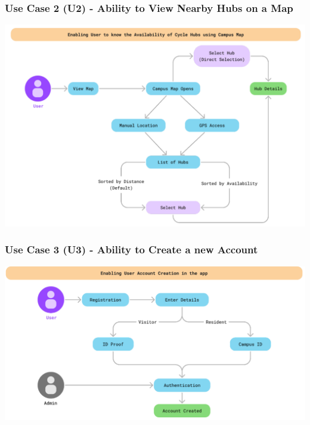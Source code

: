 \documentclass[11pt]{article}
\begin{document}
\subsubsection{Use Case 2 (U2) - Ability to View Nearby Hubs on a Map}
\begin{center}
  \includegraphics[scale=0.5]{../srs/usecase-2.png}
\end{center}

\subsubsection{Use Case 3 (U3) - Ability to Create a new Account}
\begin{center}
  \includegraphics[scale=0.5]{../srs/usecase-3.png}
\end{center}
\end{document}
